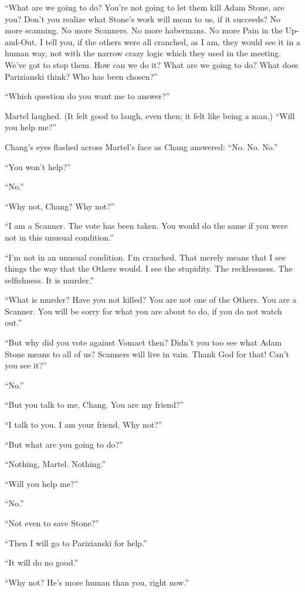 ``What are we going to do? You're not going to let them kill Adam Stone, are you? Don't you realize what Stone's work will mean to us, if it succeeds? No more scanning. No more Scanners. No more habermans. No more Pain in the Up-and-Out. I tell you, if the others were all cranched, as I am, they would see it in a human way, not with the narrow crazy logic which they used in the meeting. We've got to stop them. How can we do it? What are we going to do? What does Parizianski think? Who has been chosen?''

``Which question do you want me to answer?''

Martel laughed. (It felt good to laugh, even then; it felt like being a man.) ``Will you help me?''

Chang's eyes flashed across Martel's face as Chang answered: ``No. No. No.''

``You won't help?''

``No.''

``Why not, Chang? Why not?''

``I am a Scanner. The vote has been taken. You would do the same if you were not in this unusual condition.''

``I'm not in an unusual condition. I'm cranched. That merely means that I see things the way that the Others would. I see the stupidity. The recklessness. The selfishness. It is murder.''

``What is murder? Have you not killed? You are not one of the Others. You are a Scanner. You will be sorry for what you are about to do, if you do not watch out.''

``But why did you vote against Vomact then? Didn't you too see what Adam Stone means to all of us? Scanners will live in vain. Thank God for that! Can't you see it?''

``No.''

``But you talk to me, Chang. You are my friend?''

``I talk to you. I am your friend. Why not?''

``But what are you going to do?''

``Nothing, Martel. Nothing.''

``Will you help me?''

``No.''

``Not even to save Stone?''

``Then I will go to Parizianski for help.''

``It will do no good.''

``Why not? He's more human than you, right now.''

